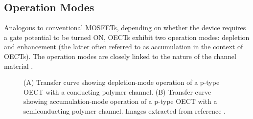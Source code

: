 \subsection{Operation Modes}

Analogous to conventional MOSFETs, depending on whether the device requires a gate potential to be turned ON, OECTs exhibit two operation modes: depletion and enhancement (the latter often referred to as accumulation in the context of OECTs). The operation modes are closely linked to the nature of the channel material%
.

\begin{figure}[h]
	\centering
	\hspace{2em}
	\caption[Depletion- and accumulation-mode OECTs]{(A) Transfer curve showing depletion-mode operation of a p-type OECT with a conducting polymer channel. (B) Transfer curve showing accumulation-mode operation of a p-type OECT with a semiconducting polymer channel. Images extracted from reference \cite{rivnayOrganicElectrochemicalTransistors2018}.}
	\label{fig:modes}
\end{figure}

